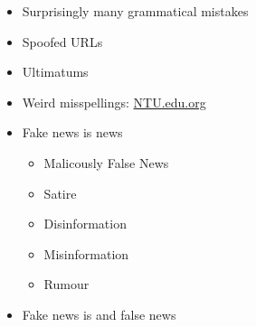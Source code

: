\documentclass[a4paper,landscape,headrule,footrule,xetex]{foils}
\begin{document}

\begin{itemize}
\item Surprisingly many grammatical mistakes
\item Spoofed URLs
\item Ultimatums
\item Weird misspellings: \url{NTU.edu.org}
\end{itemize}





\begin{itemize}
\item Fake news is  news
  \begin{itemize}
  \item Malicously False News
  \item Satire
  \item Disinformation
  \item Misinformation
  \item Rumour
  \end{itemize}
\item Fake news is  and  false news
\end{itemize}

\end{document}
